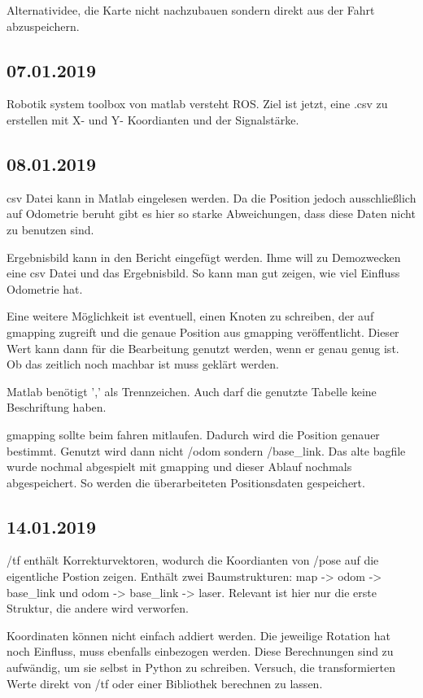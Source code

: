\documentclass{scrartcl}%
\begin{document}
Alternatividee, die Karte nicht nachzubauen sondern direkt aus der Fahrt abzuspeichern.

\subsection{07.01.2019}
Robotik system toolbox von matlab versteht ROS. Ziel ist jetzt, eine .csv zu erstellen mit X- und Y- Koordianten und der Signalstärke.

\subsection{08.01.2019}
csv Datei kann in Matlab eingelesen werden. Da die Position jedoch ausschließlich auf Odometrie beruht gibt es hier so starke Abweichungen, dass diese Daten nicht zu benutzen sind.

Ergebnisbild kann in den Bericht eingefügt werden. Ihme will zu Demozwecken eine csv Datei und das Ergebnisbild. So kann man gut zeigen, wie viel Einfluss Odometrie hat.

Eine weitere Möglichkeit ist eventuell, einen Knoten zu schreiben, der auf gmapping zugreift und die genaue Position aus gmapping veröffentlicht. Dieser Wert kann dann für die Bearbeitung genutzt werden, wenn er genau genug ist. Ob das zeitlich noch machbar ist muss geklärt werden.

Matlab benötigt ',' als Trennzeichen. Auch darf die genutzte Tabelle keine Beschriftung haben.

gmapping sollte beim fahren mitlaufen. Dadurch wird die Position genauer bestimmt. Genutzt wird dann nicht /odom sondern /base\_link. Das alte bagfile wurde nochmal abgespielt mit gmapping und dieser Ablauf nochmals abgespeichert. So werden die überarbeiteten Positionsdaten gespeichert.


\subsection{14.01.2019}
/tf enthält Korrekturvektoren, wodurch die Koordianten von /pose auf die eigentliche Postion zeigen. Enthält zwei Baumstrukturen: map -> odom -> base\_link und odom -> base\_link -> laser. Relevant ist hier nur die erste Struktur, die andere wird verworfen.

Koordinaten können nicht einfach addiert werden. Die jeweilige Rotation hat noch Einfluss, muss ebenfalls einbezogen werden. Diese Berechnungen sind zu aufwändig, um sie selbst in Python zu schreiben. Versuch, die transformierten Werte direkt von /tf oder einer Bibliothek berechnen zu lassen.
\end{document}
